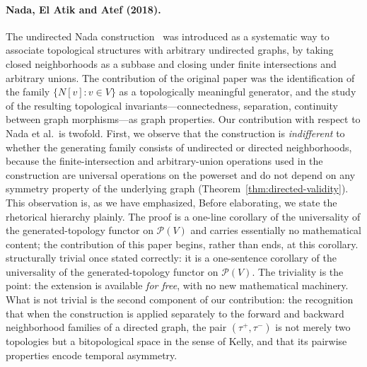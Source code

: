 \documentclass[11pt,a4paper]{article}
\theoremstyle{plain}
\theoremstyle{definition}
\newcommand{\Ncl}[1]{N[#1]}
\newcommand{\taufwd}{\tau^{+}}
\newcommand{\taubwd}{\tau^{-}}
\newcommand{\powerset}{\mathcal{P}}
\begin{document}
\paragraph{Nada, El Atik and Atef (2018).}
The undirected Nada construction~\cite{Nada2018} was introduced as a
systematic way to associate topological structures with arbitrary
undirected graphs, by taking closed neighborhoods as a subbase and
closing under finite intersections and arbitrary unions. The
contribution of the original paper was the identification of the
family $\{\Ncl{v} : v \in V\}$ as a topologically meaningful generator,
and the study of the resulting topological invariants---connectedness,
separation, continuity between graph morphisms---as graph properties.
Our contribution with respect to Nada et al.\ is twofold. First, we
observe that the construction is \emph{indifferent} to whether the
generating family consists of undirected or directed neighborhoods,
because the finite-intersection and arbitrary-union operations used in
the construction are universal operations on the powerset and do not
depend on any symmetry property of the underlying graph
(Theorem~\ref{thm:directed-validity}). This observation is, as we have
emphasized, Before elaborating, we state the rhetorical hierarchy plainly. The proof is a one-line corollary of the universality of the generated-topology functor on $\mathcal{P}(V)$ and carries essentially no mathematical content; the contribution of this paper begins, rather than ends, at this corollary. structurally trivial once stated correctly: it is a
one-sentence corollary of the universality of the generated-topology
functor on $\powerset(V)$. The triviality is the point: the extension
is available \emph{for free}, with no new mathematical machinery. What
is not trivial is the second component of our contribution: the
recognition that when the construction is applied separately to the
forward and backward neighborhood families of a directed graph, the
pair $(\taufwd, \taubwd)$ is not merely two topologies but a
bitopological space in the sense of Kelly, and that its pairwise
properties encode temporal asymmetry.
\end{document}
